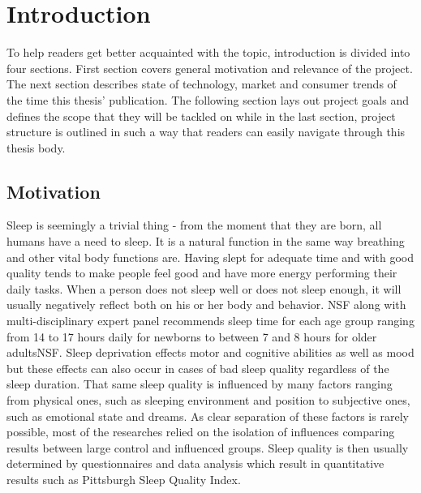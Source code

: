 \chapter{Introduction}
\label{chap:introduction}

To help readers get better acquainted with the topic, introduction is divided into four sections. First section covers general motivation and relevance of the project. The next section describes state of technology, market and consumer trends of the time this thesis' publication. The following section lays out project goals and defines the scope that they will be tackled on while in the last section, project structure is outlined in such a way that readers can easily navigate through this thesis body.


\section{Motivation}

Sleep is seemingly a trivial thing - from the moment that they are born, all humans have a need to sleep. It is a natural function in the same way breathing and other vital body functions are. Having slept for adequate time and with good quality tends to make people feel good and have more energy performing their daily tasks. When a person does not sleep well or does not sleep enough, it will usually negatively reflect both on his or her body and behavior. \ac{NSF} along with multi-disciplinary expert panel recommends sleep time for each age group ranging from 14 to 17 hours daily for newborns to between 7 and 8 hours for older adults\ac{NSF}. Sleep deprivation effects motor and cognitive abilities as well as mood but these effects can also occur in cases of bad sleep quality regardless of the sleep duration\cite{doi:10.1093/sleep/19.4.318}. That same sleep quality is influenced by many factors ranging from physical ones, such as sleeping environment and position to subjective ones, such as emotional state and dreams. As clear separation of these factors is rarely possible, most of the researches relied on the isolation of influences comparing results between large control and influenced groups. Sleep quality is then usually determined by questionnaires and data analysis which result in quantitative results such as Pittsburgh Sleep Quality Index\cite{psqi}.\\

